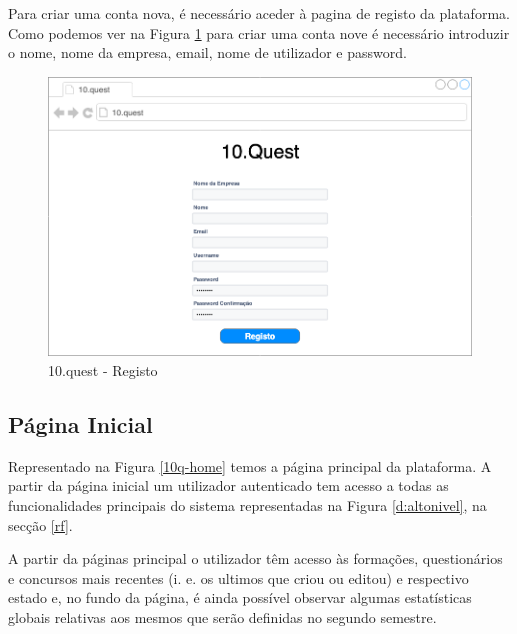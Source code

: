 Para criar uma conta nova, é necessário aceder à pagina de registo da plataforma. Como podemos ver na Figura \ref{10q-registo}  para criar uma conta nove é necessário introduzir o nome, nome da empresa, email, nome de utilizador e password.

\begin{figure}[ht!]
	\begin{center}
		\includegraphics[width=1\textwidth]{img/prototipos/2.png}
		\caption{10.quest - Registo}
		\label{10q-registo}
	\end{center}
\end{figure}

\newpage

\subsection{Página Inicial}

Representado na Figura \ref{10q-home} temos a página principal da plataforma. A partir da página inicial um utilizador autenticado tem acesso a todas as funcionalidades principais do sistema representadas na Figura \ref{d:altonivel}, na secção \ref{rf}.

A partir da páginas principal o utilizador têm acesso às formações, questionários e concursos mais recentes (i. e. os ultimos que criou ou editou) e respectivo estado e, no fundo da página, é ainda possível observar algumas estatísticas globais relativas aos mesmos que serão definidas no segundo semestre.

